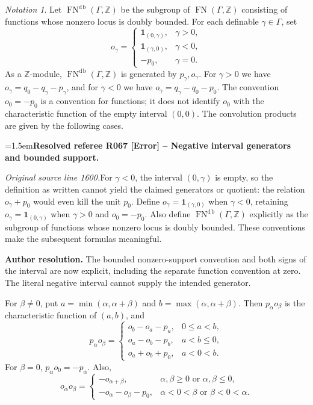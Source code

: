 \documentclass[12pt]{amsart}
\newcommand{\ResolvedRefereeRemark}[5]{%
  \par\medskip\begingroup\normalfont\small\color{gray}%
  \emergencystretch=1.5em\noindent\textbf{Resolved referee R#1 [#2] -- #3.}\par\nobreak\noindent #4\par
  \medskip\color{ResolutionGreen}\noindent\textbf{Author resolution.} #5\par
  \endgroup\medskip
}
\theoremstyle{plain}
\theoremstyle{definition}
\theoremstyle{remark}
\newtheorem{nota}[thm]{Notation}
\numberwithin{equation}{section}
\theoremstyle{plain}
\newcommand{\Z}{\mathds{Z}}
\newcommand{\0}{\emptyset}
\DeclareMathOperator{\fn}{FN}
\DeclareMathOperator{\db}{d \! b}
\begin{document}
\begin{nota}\label{db:generator}
Let $\fn^{\db}(\Gamma,\Z)$ be the subgroup of $\fn(\Gamma,\Z)$ consisting of functions whose nonzero locus is doubly bounded. For each definable $\gamma\in\Gamma$, set
\[
o_\gamma=\begin{cases}
\mathbf1_{(0,\gamma)},&\gamma>0,\\
\mathbf1_{(\gamma,0)},&\gamma<0,\\
-p_0,&\gamma=0.
\end{cases}
\]
As a $\Z$-module, $\fn^{\db}(\Gamma,\Z)$ is generated by $p_\gamma,o_\gamma$. For $\gamma>0$ we have $o_\gamma=q_0-q_\gamma-p_\gamma$, and for $\gamma<0$ we have $o_\gamma=q_\gamma-q_0-p_0$. The convention $o_0=-p_0$ is a convention for functions; it does not identify $o_0$ with the characteristic function of the empty interval $(0,0)$. The convolution products are given by the following cases.

\ResolvedRefereeRemark{067}{Error}{Negative interval generators and bounded support}{%
\textit{Original source line 1600.}\quad For $\gamma<0$, the interval $(0,\gamma)$ is empty, so the definition as written cannot yield the claimed generators or quotient: the relation $o_\gamma+p_0$ would even kill the unit $p_0$. Define $o_\gamma=\mathbf1_{(\gamma,0)}$ when $\gamma<0$, retaining $o_\gamma=\mathbf1_{(0,\gamma)}$ when $\gamma>0$ and $o_0=-p_0$. Also define $\fn^{\db}(\Gamma,\mathbb Z)$ explicitly as the subgroup of functions whose nonzero locus is doubly bounded. These conventions make the subsequent formulas meaningful.
}{The bounded nonzero-support convention and both signs of the interval are now explicit, including the separate function convention at zero. The literal negative interval cannot supply the intended generator.}
For $\beta\ne0$, put $a=\min(\alpha,\alpha+\beta)$ and $b=\max(\alpha,\alpha+\beta)$. Then $p_\alpha o_\beta$ is the characteristic function of $(a,b)$, and
\[
p_\alpha o_\beta=\begin{cases}
o_b-o_a-p_a,&0\leq a<b,\\
o_a-o_b-p_b,&a<b\leq0,\\
o_a+o_b+p_0,&a<0<b.
\end{cases}
\]
For $\beta=0$, $p_\alpha o_0=-p_\alpha$. Also,
\[
o_\alpha o_\beta=\begin{cases}
-o_{\alpha+\beta},&\alpha,\beta\geq0\text{ or }\alpha,\beta\leq0,\\
-o_\alpha-o_\beta-p_0,&\alpha<0<\beta\text{ or }\beta<0<\alpha.
\end{cases}
\]
\end{nota}
\end{document}
